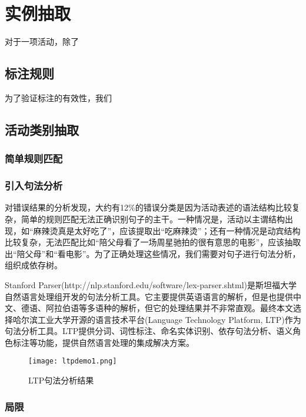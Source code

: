 \chapter{实例抽取}
对于一项活动，除了
\section{标注规则}
为了验证标注的有效性，我们

\section{活动类别抽取}
\subsection{简单规则匹配}
\subsection{引入句法分析}
对错误结果的分析发现，大约有12\%的错误分类是因为活动表述的语法结构比较复杂，简单的规则匹配无法正确识别句子的主干。一种情况是，活动以主谓结构出现，如``麻辣烫真是太好吃了''，应该提取出``吃麻辣烫''；还有一种情况是动宾结构比较复杂，无法匹配比如``陪父母看了一场周星驰拍的很有意思的电影''，应该抽取出``陪父母''和``看电影''。为了正确处理这些情况，我们需要对句子进行句法分析，组织成依存树。

Stanford Parser(http://nlp.stanford.edu/software/lex-parser.shtml)是斯坦福大学自然语言处理组开发的句法分析工具。它主要提供英语语言的解析，但是也提供中文、德语、阿拉伯语等多语种的解析，但它的处理结果并不非常直观。最终本文选择哈尔滨工业大学开源的语言技术平台(Language Technology Platform, LTP)\cite{che2010ltp}作为句法分析工具。LTP提供分词、词性标注、命名实体识别、依存句法分析、语义角色标注等功能，提供自然语言处理的集成解决方案。

\begin{figure}[!h]
\centering
\texttt{[image: ltpdemo1.png]}
\caption{LTP句法分析结果}
\label{fig:ltp_demo}
\end{figure}


\subsection{局限}


